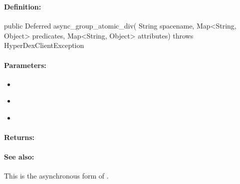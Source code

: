 \pagebreak
\subsubsection{}
\label{api:java:async_group_atomic_div}


\paragraph{Definition:}
\begin{javacode}
public Deferred async_group_atomic_div(
        String spacename,
        Map<String, Object> predicates,
        Map<String, Object> attributes) throws HyperDexClientException
\end{javacode}

\paragraph{Parameters:}
\begin{itemize}[noitemsep]
\item {}\\

\item {}\\

\item {}\\

\end{itemize}

\paragraph{Returns:}


\paragraph{See also:}  This is the asynchronous form of .

\pagebreak
\subsubsection{}
\label{api:java:atomic_mod}



